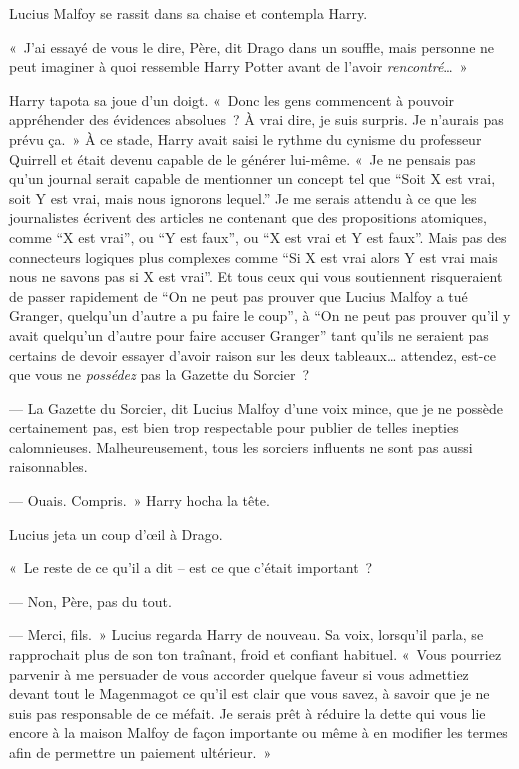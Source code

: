 Lucius Malfoy se rassit dans sa chaise et contempla Harry.

«~J'ai essayé de vous le dire, Père, dit Drago dans un souffle, mais personne ne peut imaginer à quoi ressemble Harry Potter avant de l'avoir \emph{rencontré}…~»

Harry tapota sa joue d'un doigt.
«~Donc les gens commencent à pouvoir appréhender des évidences absolues~?
À vrai dire, je suis surpris.
Je n'aurais pas prévu ça.~»
À ce stade, Harry avait saisi le rythme du cynisme du professeur Quirrell et était devenu capable de le générer lui-même.
«~Je ne pensais pas qu'un journal serait capable de mentionner un concept tel que “Soit X est vrai, soit Y est vrai, mais nous ignorons lequel.” Je me serais attendu à ce que les journalistes écrivent des articles ne contenant que des propositions atomiques, comme “X est vrai”, ou “Y est faux”, ou “X est vrai et Y est faux”.
Mais pas des connecteurs logiques plus complexes comme “Si X est vrai alors Y est vrai mais nous ne savons pas si X est vrai”.
Et tous ceux qui vous soutiennent risqueraient de passer rapidement de “On ne peut pas prouver que Lucius Malfoy a tué Granger, quelqu'un d'autre a pu faire le coup”, à “On ne peut pas prouver qu'il y avait quelqu'un d'autre pour faire accuser Granger” tant qu'ils ne seraient pas certains de devoir essayer d'avoir raison sur les deux tableaux… attendez, est-ce que vous ne \emph{possédez} pas la Gazette du Sorcier~?

--- La Gazette du Sorcier, dit Lucius Malfoy d'une voix mince, que je ne possède certainement pas, est bien trop respectable pour publier de telles inepties calomnieuses.
Malheureusement, tous les sorciers influents ne sont pas aussi raisonnables.

--- Ouais.
Compris.~»
Harry hocha la tête.

Lucius jeta un coup d'œil à Drago.

«~Le reste de ce qu'il a dit -- est ce que c'était important~?

--- Non, Père, pas du tout.

--- Merci, fils.~»
Lucius regarda Harry de nouveau.
Sa voix, lorsqu'il parla, se rapprochait plus de son ton traînant, froid et confiant habituel.
«~Vous pourriez parvenir à me persuader de vous accorder quelque faveur si vous admettiez devant tout le Magenmagot ce qu'il est clair que vous savez, à savoir que je ne suis pas responsable de ce méfait.
Je serais prêt à réduire la dette qui vous lie encore à la maison Malfoy de façon importante ou même à en modifier les termes afin de permettre un paiement ultérieur.~»

